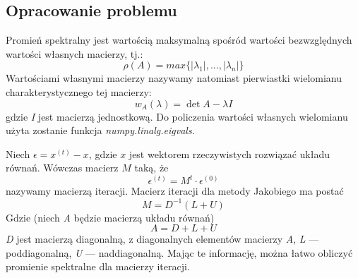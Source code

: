 \documentclass{article}
\begin{document}
\subsection{Opracowanie problemu}
Promień spektralny jest wartością maksymalną spośród wartości bezwzględnych wartości własnych macierzy, tj.:
$$\rho(A)=max\{|\lambda_1|,..., |\lambda_n|\}$$
Wartościami własnymi macierzy nazywamy natomiast pierwiastki wielomianu charakterystycznego tej macierzy:
$$w_{A}(\lambda)=\det{A- \lambda I}$$
gdzie \textit{I} jest macierzą jednostkową. Do policzenia wartości własnych wielomianu użyta zostanie funkcja 
\textit{numpy.linalg.eigvals}.

Niech $\epsilon=x^{(t)}-x$, gdzie $x$ jest wektorem rzeczywistych rozwiązać układu równań. Wówczas macierz $M$ taką, że
$$\epsilon^{(t)}=M^t \cdot \epsilon^{(0)}$$
nazywamy macierzą iteracji.
Macierz iteracji dla metody Jakobiego ma postać
$$M=D^{-1}(L+U)$$
Gdzie (niech \textit{A} będzie macierzą układu równań)
$$A = D + L + U$$
\textit{D} jest macierzą diagonalną, z diagonalnych elementów macierzy \textit{A}, \textit{L} --- poddiagonalną, 
\textit{U} --- naddiagonalną. Mając te informację, można łatwo obliczyć promienie spektralne dla macierzy iteracji.

\newpage
\thispagestyle{empty}
\end{document}
